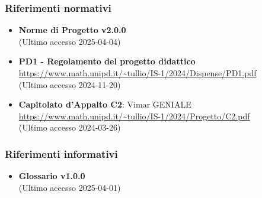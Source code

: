 \subsubsection{Riferimenti normativi}
\begin{itemize}
    \item \textbf{Norme di Progetto v2.0.0}\\
    (Ultimo accesso 2025-04-04)
    \item \textbf{PD1 - Regolamento del progetto didattico} \\
    \url{https://www.math.unipd.it/~tullio/IS-1/2024/Dispense/PD1.pdf} \\
    (Ultimo accesso 2024-11-20)
    \item \textbf{Capitolato d'Appalto C2}: Vimar GENIALE \\
    \url{https://www.math.unipd.it/~tullio/IS-1/2024/Progetto/C2.pdf}\\
    (Ultimo accesso 2024-03-26)
    \end{itemize}
\subsubsection{Riferimenti informativi}
\begin{itemize}
    \item \textbf{Glossario v1.0.0} \\
    (Ultimo acecsso 2025-04-01)
\end{itemize}